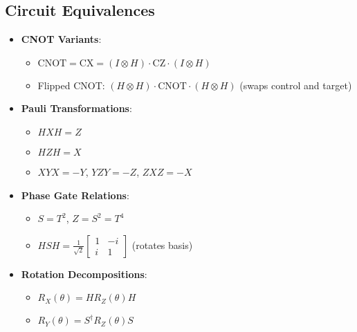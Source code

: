 \begin{multicols}{3}
    \section*{Circuit Equivalences}
    \begin{itemize}[leftmargin=*,nosep,topsep=0pt]
      \item \textbf{CNOT Variants}:
        \begin{itemize}[nosep]
          \item $\text{CNOT} = \text{CX} = (I \otimes H) \cdot \text{CZ} \cdot (I \otimes H)$
          \item Flipped CNOT: $(H \otimes H) \cdot \text{CNOT} \cdot (H
            \otimes H)$ (swaps control and target)
        \end{itemize}
      \item \textbf{Pauli Transformations}:
        \begin{itemize}[nosep]
          \item $H X H = Z$
          \item $H Z H = X$
          \item $X Y X = -Y$, $Y Z Y = -Z$, $Z X Z = -X$
        \end{itemize}
      \item \textbf{Phase Gate Relations}:
        \begin{itemize}[nosep]
          \item $S = T^2$, $Z = S^2 = T^4$
          \item $H S H = \frac{1}{\sqrt{2}} \begin{bmatrix} 1 & -i \\ i & 1 \end{bmatrix}$ (rotates basis)
        \end{itemize}
      \item \textbf{Rotation Decompositions}:
        \begin{itemize}[nosep]
          \item $R_X(\theta) = H R_Z(\theta) H$
          \item $R_Y(\theta) = S^\dagger R_Z(\theta) S$
        \end{itemize}
    \end{itemize}

  \end{multicols}

\endgroup
